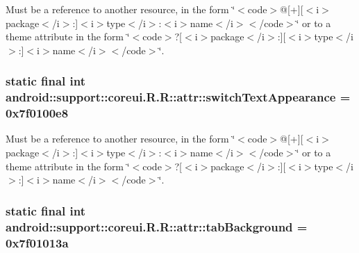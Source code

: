 Must be a reference to another resource, in the form \char`\"{}$<$code$>$@\mbox{[}+\mbox{]}\mbox{[}$<$i$>$package$<$/i$>$:\mbox{]}$<$i$>$type$<$/i$>$:$<$i$>$name$<$/i$>$$<$/code$>$\char`\"{} or to a theme attribute in the form \char`\"{}$<$code$>$?\mbox{[}$<$i$>$package$<$/i$>$:\mbox{]}\mbox{[}$<$i$>$type$<$/i$>$:\mbox{]}$<$i$>$name$<$/i$>$$<$/code$>$\char`\"{}. \hypertarget{classandroid_1_1support_1_1coreui_1_1_r_1_1attr_1c56d5f95767e3d97fad7b648b938bf5}{
\subsubsection[{switchTextAppearance}]{\setlength{\rightskip}{0pt plus 5cm}static final int android::support::coreui.R.R::attr::switchTextAppearance = 0x7f0100e8}}
\label{classandroid_1_1support_1_1coreui_1_1_r_1_1attr_1c56d5f95767e3d97fad7b648b938bf5}


Must be a reference to another resource, in the form \char`\"{}$<$code$>$@\mbox{[}+\mbox{]}\mbox{[}$<$i$>$package$<$/i$>$:\mbox{]}$<$i$>$type$<$/i$>$:$<$i$>$name$<$/i$>$$<$/code$>$\char`\"{} or to a theme attribute in the form \char`\"{}$<$code$>$?\mbox{[}$<$i$>$package$<$/i$>$:\mbox{]}\mbox{[}$<$i$>$type$<$/i$>$:\mbox{]}$<$i$>$name$<$/i$>$$<$/code$>$\char`\"{}. \hypertarget{classandroid_1_1support_1_1coreui_1_1_r_1_1attr_f4db06c04257994895918d2029d17c99}{
\subsubsection[{tabBackground}]{\setlength{\rightskip}{0pt plus 5cm}static final int android::support::coreui.R.R::attr::tabBackground = 0x7f01013a}}
\label{classandroid_1_1support_1_1coreui_1_1_r_1_1attr_f4db06c04257994895918d2029d17c99}


